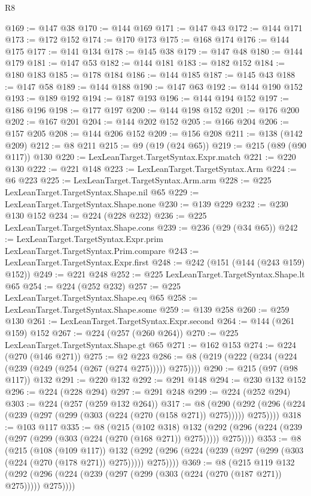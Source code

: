 \begin{lexlean}{R8}
\begin{coremodule}
@169 := @147 @38
@170 := @144 @169
@171 := @147 @43
@172 := @144 @171
@173 := @172 @152
@174 := @170 @173
@175 := @168 @174
@176 := @144 @175
@177 := @141 @134
@178 := @145 @38
@179 := @147 @48
@180 := @144 @179
@181 := @147 @53
@182 := @144 @181
@183 := @182 @152
@184 := @180 @183
@185 := @178 @184
@186 := @144 @185
@187 := @145 @43
@188 := @147 @58
@189 := @144 @188
@190 := @147 @63
@192 := @144 @190 @152
@193 := @189 @192
@194 := @187 @193
@196 := @144 @194 @152
@197 := @186 @196
@198 := @177 @197
@200 := @144 @198 @152
@201 := @176 @200
@202 := @167 @201
@204 := @144 @202 @152
@205 := @166 @204
@206 := @157 @205
@208 := @144 @206 @152
@209 := @156 @208
@211 := @138 (@142 @209)
@212 := @8 @211
@215 := @9 (@19 (@24 @65))
@219 := @215 (@89 (@90 @117)) @130
@220 := LexLeanTarget.TargetSyntax.Expr.match
@221 := @220 @130
@222 := @221 @148
@223 := LexLeanTarget.TargetSyntax.Arm
@224 := @6 @223
@225 := LexLeanTarget.TargetSyntax.Arm.arm
@228 := @225 LexLeanTarget.TargetSyntax.Shape.nil @65
@229 := LexLeanTarget.TargetSyntax.Shape.none
@230 := @139 @229
@232 := @230 @130 @152
@234 := @224 (@228 @232)
@236 := @225 LexLeanTarget.TargetSyntax.Shape.cons
@239 := @236 (@29 (@34 @65))
@242 := LexLeanTarget.TargetSyntax.Expr.prim LexLeanTarget.TargetSyntax.Prim.compare
@243 := LexLeanTarget.TargetSyntax.Expr.first
@248 := @242 (@151 (@144 (@243 @159) @152))
@249 := @221 @248
@252 := @225 LexLeanTarget.TargetSyntax.Shape.lt @65
@254 := @224 (@252 @232)
@257 := @225 LexLeanTarget.TargetSyntax.Shape.eq @65
@258 := LexLeanTarget.TargetSyntax.Shape.some
@259 := @139 @258
@260 := @259 @130
@261 := LexLeanTarget.TargetSyntax.Expr.second
@264 := @144 (@261 @159) @152
@267 := @224 (@257 (@260 @264))
@270 := @225 LexLeanTarget.TargetSyntax.Shape.gt @65
@271 := @162 @153
@274 := @224 (@270 (@146 @271))
@275 := @2 @223
@286 := @8 (@219 (@222 (@234 (@224 (@239 (@249 (@254 (@267 (@274 @275))))) @275))))
@290 := @215 (@97 (@98 @117)) @132
@291 := @220 @132
@292 := @291 @148
@294 := @230 @132 @152
@296 := @224 (@228 @294)
@297 := @291 @248
@299 := @224 (@252 @294)
@303 := @224 (@257 (@259 @132 @264))
@317 := @8
    (@290 (@292 (@296 (@224 (@239 (@297 (@299 (@303 (@224 (@270 (@158 @271)) @275))))) @275))))
@318 := @103 @117
@335 := @8
    (@215
      (@102 @318)
      @132
      (@292 (@296 (@224 (@239 (@297 (@299 (@303 (@224 (@270 (@168 @271)) @275))))) @275))))
@353 := @8
    (@215
      (@108 (@109 @117))
      @132
      (@292 (@296 (@224 (@239 (@297 (@299 (@303 (@224 (@270 (@178 @271)) @275))))) @275))))
@369 := @8
    (@215
      @119
      @132
      (@292 (@296 (@224 (@239 (@297 (@299 (@303 (@224 (@270 (@187 @271)) @275))))) @275))))

\end{coremodule}
\end{lexlean}
